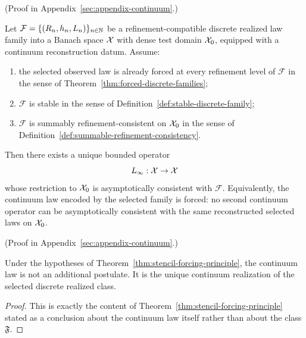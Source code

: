 (Proof in Appendix~\ref{sec:appendix-continuum}.)

\begin{theorem}
\label{thm:stencil-forcing-principle}
Let $\mathcal F=\{(R_n,h_n,L_n)\}_{n\in\mathbb{N}}$ be a refinement-compatible
discrete realized law family into a Banach space $\mathcal{X}$ with dense test domain
$\mathcal{X}_0$, equipped with a continuum reconstruction datum. Assume:
\begin{enumerate}[label=(\roman*), leftmargin=2em, itemsep=0.2em]
\item the selected observed law is already forced at every refinement level of
      $\mathcal F$ in the sense of
      Theorem~\ref{thm:forced-discrete-families};
\item $\mathcal F$ is stable in the sense of
      Definition~\ref{def:stable-discrete-family};
\item $\mathcal F$ is summably refinement-consistent on $\mathcal{X}_0$ in the sense
      of Definition~\ref{def:summable-refinement-consistency}.
\end{enumerate}
Then there exists a unique bounded operator
\[
L_\infty:\mathcal{X}\to\mathcal{X}
\]
whose restriction to $\mathcal{X}_0$ is asymptotically consistent with $\mathcal F$.
Equivalently, the continuum law encoded by the selected family is forced: no
second continuum operator can be asymptotically consistent with the same
reconstructed selected laws on $\mathcal{X}_0$.
\end{theorem}

(Proof in Appendix~\ref{sec:appendix-continuum}.)

\begin{corollary}
\label{cor:discrete-to-continuum-forcing}
Under the hypotheses of Theorem~\ref{thm:stencil-forcing-principle}, the
continuum law is not an additional postulate. It is the unique continuum
realization of the selected discrete realized class.
\end{corollary}

\begin{proof}
This is exactly the content of
Theorem~\ref{thm:stencil-forcing-principle} stated as a conclusion about the
continuum law itself rather than about the class $\mathfrak F$.
\end{proof}

